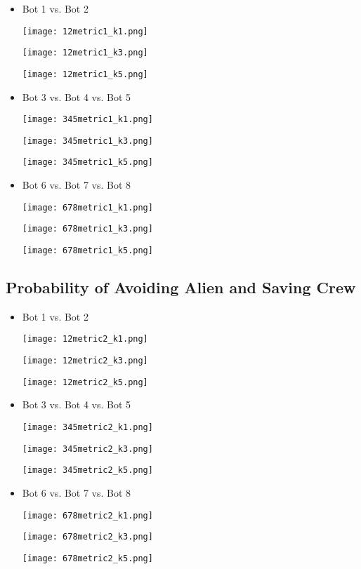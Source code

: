 \documentclass[11pt]{article}
\begin{document}
\begin{itemize}
    \item Bot 1 vs. Bot 2
       
    \texttt{[image: 12metric1\_k1.png]} 

    \texttt{[image: 12metric1\_k3.png]}

    \texttt{[image: 12metric1\_k5.png]}
    
    \item Bot 3 vs. Bot 4 vs. Bot 5

    \texttt{[image: 345metric1\_k1.png]}

    \texttt{[image: 345metric1\_k3.png]}

    \texttt{[image: 345metric1\_k5.png]}
    
    \item Bot 6 vs. Bot 7 vs. Bot 8
    
    \texttt{[image: 678metric1\_k1.png]}

    \texttt{[image: 678metric1\_k3.png]}

    \texttt{[image: 678metric1\_k5.png]}

\end{itemize}

\subsection{Probability of Avoiding Alien and Saving Crew}

\begin{itemize}
    \item Bot 1 vs. Bot 2

    \texttt{[image: 12metric2\_k1.png]}

    \texttt{[image: 12metric2\_k3.png]}

    \texttt{[image: 12metric2\_k5.png]}
    
    \item Bot 3 vs. Bot 4 vs. Bot 5

    \texttt{[image: 345metric2\_k1.png]}

    \texttt{[image: 345metric2\_k3.png]}

    \texttt{[image: 345metric2\_k5.png]}
    
    \item Bot 6 vs. Bot 7 vs. Bot 8

    \texttt{[image: 678metric2\_k1.png]}

    \texttt{[image: 678metric2\_k3.png]}

    \texttt{[image: 678metric2\_k5.png]}

\end{itemize}
\end{document}
